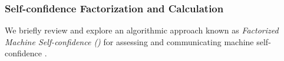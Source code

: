 
    
\subsubsection{Self-confidence Factorization and Calculation} \label{sec:self-confidence}

    We briefly review and explore an algorithmic approach known as \textit{Factorized Machine Self-confidence (\famsec{})} for assessing and communicating machine self-confidence \cite{Aitken2016-cv}. 
